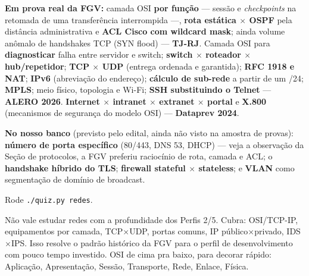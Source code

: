 \begin{jacaiu}
\textbf{Em prova real da FGV:} camada OSI \textbf{por função} --- sessão e
\emph{checkpoints} na retomada de uma transferência interrompida ---,
\textbf{rota estática $\times$ OSPF} pela distância administrativa e
\textbf{ACL Cisco com wildcard mask}; ainda volume anômalo de handshakes TCP
(SYN flood) --- \textbf{TJ-RJ}. Camada OSI para \textbf{diagnosticar} falha
entre servidor e switch; \textbf{switch $\times$ roteador $\times$
hub/repetidor}; \textbf{TCP $\times$ UDP} (entrega ordenada e garantida);
\textbf{RFC 1918 e NAT}; \textbf{IPv6} (abreviação do endereço);
\textbf{cálculo de sub-rede} a partir de um /24; \textbf{MPLS}; meio físico,
topologia e Wi-Fi; \textbf{SSH substituindo o Telnet} ---
\textbf{ALERO 2026}. \textbf{Internet $\times$ intranet $\times$ extranet
$\times$ portal} e \textbf{X.800} (mecanismos de segurança do modelo OSI) ---
\textbf{Dataprev 2024}.

\textbf{No nosso banco} (previsto pelo edital, ainda não visto na amostra de
provas): \textbf{número de porta específico} (80/443, DNS 53, DHCP) --- veja
a observação da Seção de protocolos, a FGV preferiu raciocínio de rota,
camada e ACL; o \textbf{handshake híbrido do TLS}; \textbf{firewall stateful
$\times$ stateless}; e \textbf{VLAN} como segmentação de domínio de
broadcast.

Rode \texttt{./quiz.py redes}.
\end{jacaiu}

\begin{comosair}
Não vale estudar redes com a profundidade dos Perfis 2/5. Cubra:
OSI/TCP-IP, equipamentos por camada, TCP$\times$UDP, portas comuns, IP
público$\times$privado, IDS$\times$IPS. Isso resolve o padrão histórico da
FGV para o perfil de desenvolvimento com pouco tempo investido. OSI de cima
pra baixo, para decorar rápido: Aplicação, Apresentação, Sessão, Transporte,
Rede, Enlace, Física.
\end{comosair}

